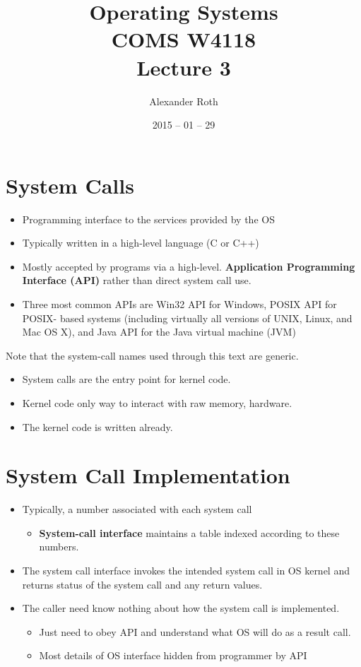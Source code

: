 \documentclass[]{article}
\begin{document}
\newtheorem{thm}{Theorem}
\title{Operating Systems \\ COMS W4118 \\ Lecture 3}
\author{Alexander Roth}
\date{2015 -- 01 -- 29}
\maketitle

\section{System Calls}
\begin{itemize}
\item Programming interface to the services provided by the OS
\item Typically written in a high-level language (C or C++)
\item Mostly accepted by programs via a high-level. \textbf{Application
Programming Interface (API)} rather than direct system call use.
\item Three most common APIs are Win32 API for Windows, POSIX API for POSIX-
based systems (including virtually all versions of UNIX, Linux, and Mac OS X),
and Java API for the Java virtual machine (JVM)
\end{itemize}

Note that the system-call names used through this text are generic.

\begin{itemize}
\item System calls are the entry point for kernel code.
\item Kernel code only way to interact with raw memory, hardware.
\item The kernel code is written already.
\end{itemize}

\section{System Call Implementation}
\begin{itemize}
\item Typically, a number associated with each system call
\begin{itemize}
\item \textbf{System-call interface} maintains a table indexed according to
these numbers.
\end{itemize}
\item The system call interface invokes the intended system call in OS kernel
and returns status of the system call and any return values.
\item The caller need know nothing about how the system call is implemented.
\begin{itemize}
\item Just need to obey API and understand what OS will do as a result call.
\item Most details of OS interface hidden from programmer by API
\end{itemize}
\end{itemize}
\end{document}
